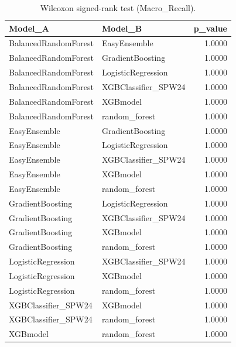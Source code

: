 \begin{table}[t]
\centering
\begin{tabular}{llr}
\toprule
Model_A & Model_B & p_value \\
\midrule
BalancedRandomForest & EasyEnsemble & 1.0000 \\
BalancedRandomForest & GradientBoosting & 1.0000 \\
BalancedRandomForest & LogisticRegression & 1.0000 \\
BalancedRandomForest & XGBClassifier_SPW24 & 1.0000 \\
BalancedRandomForest & XGBmodel & 1.0000 \\
BalancedRandomForest & random_forest & 1.0000 \\
EasyEnsemble & GradientBoosting & 1.0000 \\
EasyEnsemble & LogisticRegression & 1.0000 \\
EasyEnsemble & XGBClassifier_SPW24 & 1.0000 \\
EasyEnsemble & XGBmodel & 1.0000 \\
EasyEnsemble & random_forest & 1.0000 \\
GradientBoosting & LogisticRegression & 1.0000 \\
GradientBoosting & XGBClassifier_SPW24 & 1.0000 \\
GradientBoosting & XGBmodel & 1.0000 \\
GradientBoosting & random_forest & 1.0000 \\
LogisticRegression & XGBClassifier_SPW24 & 1.0000 \\
LogisticRegression & XGBmodel & 1.0000 \\
LogisticRegression & random_forest & 1.0000 \\
XGBClassifier_SPW24 & XGBmodel & 1.0000 \\
XGBClassifier_SPW24 & random_forest & 1.0000 \\
XGBmodel & random_forest & 1.0000 \\
\bottomrule
\end{tabular}
\caption{Wilcoxon signed-rank test (Macro_Recall).}
\label{tab:wilcoxon_Macro_Recall}
\end{table}